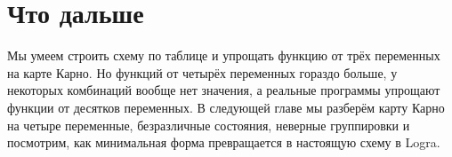 \section{Что дальше}

Мы умеем строить схему по таблице и упрощать функцию от трёх переменных на
карте Карно. Но функций от четырёх переменных гораздо больше, у некоторых
комбинаций вообще нет значения, а реальные программы упрощают функции от
десятков переменных. В следующей главе мы разберём карту Карно на четыре
переменные, безразличные состояния, неверные группировки и посмотрим,
как минимальная форма превращается в настоящую схему в Logra.
